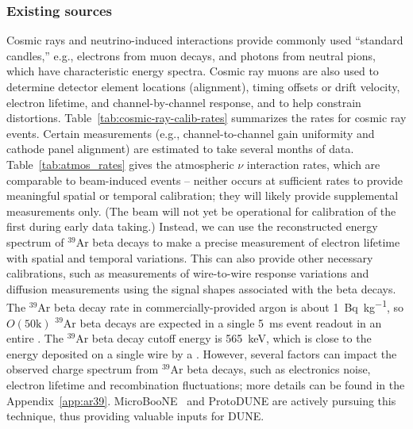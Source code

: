 \subsubsection{Existing sources} 
\label{sec:phys-calib-exis}
Cosmic rays and neutrino-induced interactions provide commonly used ``standard candles,'' e.g., electrons from muon decays, and photons from neutral pions, which have characteristic energy spectra. Cosmic ray muons are also used to determine detector element locations (alignment), timing offsets or drift velocity, electron lifetime, and channel-by-channel response, and to help constrain \efield distortions. 
Table~\ref{tab:cosmic-ray-calib-rates} summarizes the rates for cosmic ray events. Certain measurements (e.g., channel-to-channel gain uniformity and cathode panel alignment) are estimated to take several months of data. Table~\ref{tab:atmos_rates} gives the atmospheric $\nu$ interaction rates, which  
 are comparable to beam-induced events -- neither occurs at sufficient rates to provide meaningful spatial or temporal calibration; they will likely provide supplemental measurements only. (The beam will not yet be operational for calibration of the first  during early data taking.) Instead, we can use the reconstructed energy spectrum of ${}^{39}$Ar beta decays to make a precise measurement of electron lifetime with spatial and temporal variations. 
 This can also provide other necessary calibrations, such as measurements of wire-to-wire response variations and diffusion measurements using the signal shapes associated with the beta decays. The ${}^{39}$Ar beta decay rate in commercially-provided argon is about \SI{1}{\becquerel\per\kilo\gram}, so $O(\mathrm{50k})$ ${}^{39}$Ar beta decays are expected in a single \SI{5}{\milli\s} event readout in an entire \nominalmodsize \detmodule. 
 The ${}^{39}$Ar beta decay cutoff energy is \SI{565}{\keV},  which is close to the energy deposited on a single wire by a . However, several factors can impact the observed charge spectrum from ${}^{39}$Ar beta decays, such as electronics noise, electron lifetime and recombination fluctuations; more details can be found in the Appendix~\ref{app:ar39}. MicroBooNE~\cite{MICROBOONE-NOTE-1050-PUB} and ProtoDUNE are actively pursuing this technique, thus providing valuable inputs for DUNE.


